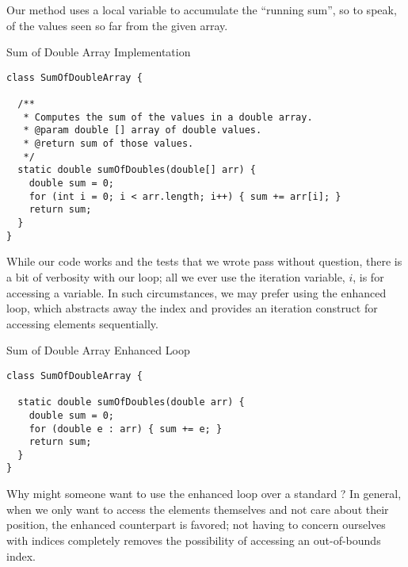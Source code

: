 Our method uses a local variable to accumulate the ``running sum'', so to speak, of the values seen so far from the given array.

\begin{cl}{Sum of Double Array Implementation}
\begin{lstlisting}[language=MyJava]
class SumOfDoubleArray {

  /**
   * Computes the sum of the values in a double array.
   * @param double [] array of double values.
   * @return sum of those values.
   */
  static double sumOfDoubles(double[] arr) {
    double sum = 0;
    for (int i = 0; i < arr.length; i++) { sum += arr[i]; }
    return sum;
  }
}
\end{lstlisting}
\end{cl}

While our code works and the tests that we wrote pass without question, there is a bit of verbosity with our loop; all we ever use the iteration variable, $i$, is for accessing a variable. In such circumstances, we may prefer using the enhanced  loop, which abstracts away the index and provides an iteration construct for accessing elements sequentially.

\begin{cl}{Sum of Double Array Enhanced  Loop}
\begin{lstlisting}[language=MyJava]
class SumOfDoubleArray {

  static double sumOfDoubles(double arr) {
    double sum = 0;
    for (double e : arr) { sum += e; }
    return sum;
  }
}
\end{lstlisting}
\end{cl}

Why might someone want to use the enhanced  loop over a standard ? In general, when we only want to access the elements themselves and not care about their position, the enhanced counterpart is favored; not having to concern ourselves with indices completely removes the possibility of accessing an out-of-bounds index. 


